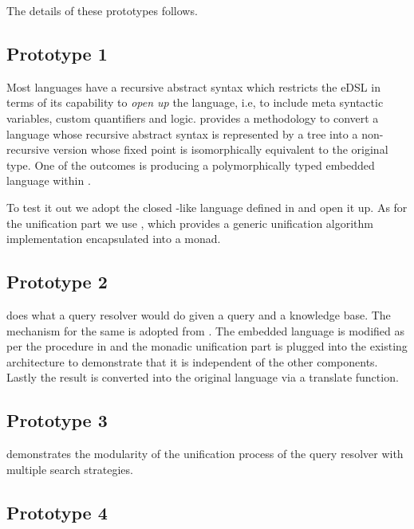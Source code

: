 \documentclass[thesis-solanki.tex]{subfiles}
\begin{document}
The details of these prototypes follows.

\subsection{Prototype 1}

Most languages have a recursive abstract syntax which restricts the eDSL
 in terms of its capability to \textit{open up} the language, i.e, to
include meta syntactic variables, custom quantifiers and logic.
 provides a methodology to convert a language whose recursive abstract
syntax is represented by a tree into a non-recursive version whose fixed point is isomorphically equivalent to the
original type.
One of the outcomes is producing a polymorphically typed embedded language within .

To test it out we adopt the closed -like language defined in \cite{prolog-lib} and open it up.
As for the unification part we use \cite{unification-fd-lib}, which provides a generic unification algorithm
implementation encapsulated into a monad.


\subsection{Prototype 2}

 does what a  query resolver would do given a query
and a knowledge base.
The mechanism for the same is adopted from \cite{prolog-lib}.
The embedded language is modified as per the procedure in  and the monadic
unification part is plugged into the existing architecture to demonstrate that it is independent of the other
components.
Lastly the result is converted into the original language via a translate function.

\subsection{Prototype 3}

 demonstrates the modularity of the unification process of the query
resolver with multiple search strategies.

\subsection{Prototype 4}
\end{document}

